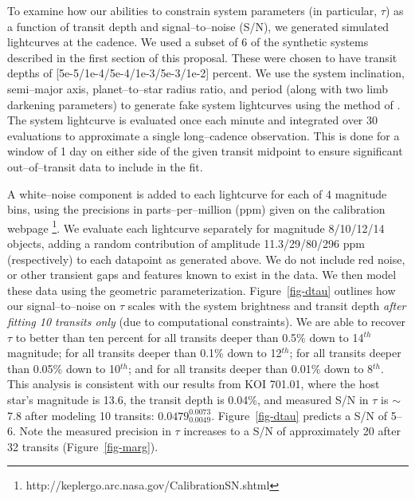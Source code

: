 \medskip
{\centerline{}}
\smallskip

To examine how our abilities to constrain system parameters (in
particular, $\tau$) as a function of transit depth and
signal--to--noise (S/N), we generated simulated lightcurves at
the \kepler cadence.  We used a subset of 6 of the synthetic systems
described in the first section of this proposal.  These were chosen to
have transit depths of [5e-5/1e-4/5e-4/1e-3/5e-3/1e-2] percent.  We
use the system inclination, semi--major axis, planet--to--star radius
ratio, and period (along with two limb darkening parameters) to
generate fake system lightcurves using the method of
\cite{2002ApJ...580L.171M}.  The system lightcurve is evaluated once
each minute and integrated over 30 evaluations to approximate a single
\kepler long--cadence observation.  This is done for a window of 1 day
on either side of the given transit midpoint to ensure significant
out--of--transit data to include in the fit.

A white--noise component is added to each lightcurve for each of 4
magnitude bins, using the precisions in parts--per--million (ppm)
given on the \kepler calibration
webpage \footnote{http://keplergo.arc.nasa.gov/CalibrationSN.shtml}.
We evaluate each lightcurve separately for magnitude 8/10/12/14
objects, adding a random contribution of amplitude 11.3/29/80/296 ppm
(respectively) to each datapoint as generated above.  We do not
include red noise, or other transient gaps and features known to exist
in the \kepler data.  We then model these data using the geometric
parameterization.  Figure~\ref{fig-dtau} outlines how our
signal--to--noise on $\tau$ scales with the system brightness and
transit depth {\it after fitting 10 transits only} (due to
computational constraints).  We are able to recover $\tau$ to better
than ten percent for all transits deeper than 0.5\% down to 14$^{th}$
magnitude; for all transits deeper than 0.1\% down to 12$^{th}$; for
all transits deeper than 0.05\% down to 10$^{th}$; and for all
transits deeper than 0.01\% down to 8$^{th}$.  This analysis is
consistent with our results from KOI 701.01, where the host star's
magnitude is 13.6, the transit depth is 0.04\%, and measured S/N in
$\tau$ is $\sim$ 7.8 after modeling 10 transits:
$0.0479_{0.0049}^{0.0073}$.  Figure~\ref{fig-dtau} predicts a S/N of
5--6.  Note the measured precision in $\tau$ increases to a S/N of
approximately 20 after 32 transits (Figure~\ref{fig-marg}).

